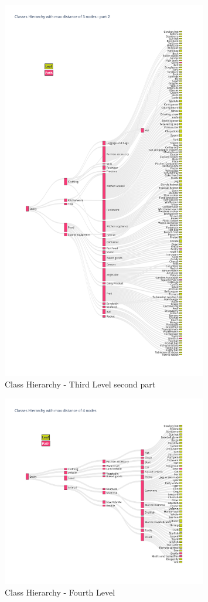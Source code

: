 \documentclass[11pt, a4paper, twocolumn]{article}
\begin{document}
\begin{appendices}
\begin{figure}[!ht]
		\includegraphics[width=0.8\textwidth]{lvl3_classes_pt2.png}
		\caption{\scriptsize Class Hierarchy - Third Level second part}
	\end{figure}
	
	\begin{figure}[!ht]
		\centering
		\includegraphics[width=0.8\textwidth]{lvl4_classes.png}
		\caption{\scriptsize Class Hierarchy - Fourth Level}
	\end{figure}
	

\end{appendices}
\end{document}
